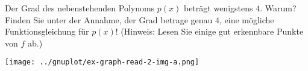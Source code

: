 \item

\begin{multicols}{2}

Der Grad des nebenstehenden Polynoms $p(x)$ beträgt wenigstens $4$. Warum? Finden Sie unter der Annahme, der Grad betrage genau $4$, eine mögliche Funktionsgleichung für $p(x)$! (Hinweis: Lesen Sie einige gut erkennbare Punkte von $f$ ab.) 

\columnbreak

\texttt{[image: ../gnuplot/ex-graph-read-2-img-a.png]}

\end{multicols}

